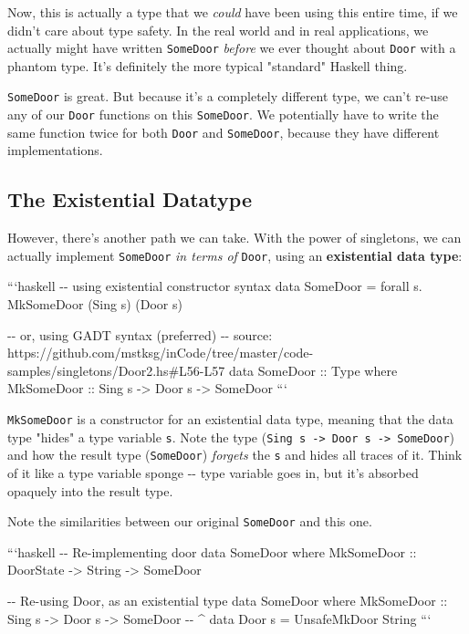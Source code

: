 \documentclass[]{article}
\begin{document}
Now, this is actually a type that we \emph{could} have been using this entire
time, if we didn't care about type safety. In the real world and in real
applications, we actually might have written \texttt{SomeDoor} \emph{before} we
ever thought about \texttt{Door} with a phantom type. It's definitely the more
typical "standard" Haskell thing.

\texttt{SomeDoor} is great. But because it's a completely different type, we
can't re-use any of our \texttt{Door} functions on this \texttt{SomeDoor}. We
potentially have to write the same function twice for both \texttt{Door} and
\texttt{SomeDoor}, because they have different implementations.

\subsection{The Existential Datatype}

However, there's another path we can take. With the power of singletons, we can
actually implement \texttt{SomeDoor} \emph{in terms of} \texttt{Door}, using an
\textbf{existential data type}:

```haskell -\/- using existential constructor syntax data SomeDoor = forall s.
MkSomeDoor (Sing s) (Door s)

-\/- or, using GADT syntax (preferred) -\/- source:
https://github.com/mstksg/inCode/tree/master/code-samples/singletons/Door2.hs\#L56-L57
data SomeDoor :: Type where MkSomeDoor :: Sing s -\textgreater{} Door s
-\textgreater{} SomeDoor ```

\texttt{MkSomeDoor} is a constructor for an existential data type, meaning that
the data type "hides" a type variable \texttt{s}. Note the type
(\texttt{Sing\ s\ -\textgreater{}\ Door\ s\ -\textgreater{}\ SomeDoor}) and how
the result type (\texttt{SomeDoor}) \emph{forgets} the \texttt{s} and hides all
traces of it. Think of it like a type variable sponge -\/- type variable goes
in, but it's absorbed opaquely into the result type.

Note the similarities between our original \texttt{SomeDoor} and this one.

```haskell -\/- \textbar{} Re-implementing door data SomeDoor where MkSomeDoor
:: DoorState -\textgreater{} String -\textgreater{} SomeDoor

-\/- \textbar{} Re-using Door, as an existential type data SomeDoor where
MkSomeDoor :: Sing s -\textgreater{} Door s -\textgreater{} SomeDoor -\/- \^{}
data Door s = UnsafeMkDoor String ```
\end{document}
